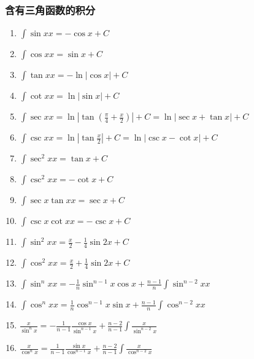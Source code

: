 \documentclass{book}
\begin{document}
\subsubsection{含有三角函数的积分}

\begin{enumerate}

\item $ \int \sin x  x = -\cos x + C $

\item $ \int \cos x  x = \sin x + C $

\item $ \int \tan x  x = -\ln|\cos x| + C $

\item $ \int \cot x  x = \ln |\sin x| + C $

\item $ \int \sec x  x = \ln \left| \tan\left( \frac{\pi}{4} + \frac{x}{2} \right) \right| + C = \ln |\sec x + \tan x| + C $

\item $ \int \csc x  x = \ln \left| \tan\frac{x}{2} \right| + C = \ln |\csc x - \cot x| + C $

\item $ \int \sec^2 x  x = \tan x + C $

\item $ \int \csc^2 x  x = -\cot x + C $

\item $ \int \sec x \tan x  x = \sec x + C $

\item $ \int \csc x \cot x  x = -\csc x + C $

\item $ \int \sin^2 x  x = \frac{x}{2} - \frac{1}{4} \sin 2x + C $

\item $ \int \cos^2 x  x = \frac{x}{2} + \frac{1}{4} \sin 2x + C $

\item $ \int \sin^n x  x = -\frac{1}{n} \sin^{n-1} x \cos x + \frac{n-1}{n} \int \sin^{n-2} x  x $

\item $ \int \cos^n x  x = \frac{1}{n} \cos^{n-1} x \sin x + \frac{n-1}{n} \int \cos^{n-2} x  x $

\item $ \frac{ x}{\sin^n x} = -\frac{1}{n-1} \frac{\cos x}{\sin^{n-1}x} + \frac{n-2}{n-1} \int \frac{ x}{\sin^{n-2}x} $

\item $ \frac{ x}{\cos^n x} = \frac{1}{n-1} \frac{\sin x}{\cos^{n-1}x} + \frac{n-2}{n-1} \int \frac{ x}{\cos^{n-2}x} $


\end{enumerate}
\end{document}
